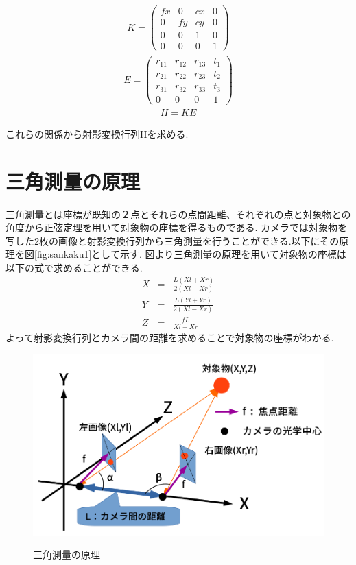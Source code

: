 \documentclass[12pt,oneside]{sotsuken_paper}
\begin{document}
\begin{eqnarray}
  K = \left(
    \begin{array}{cccc}
      fx & 0 & cx & 0\\
      0 & fy & cy & 0\\
      0 & 0 & 1 & 0\\
      0 & 0 & 0 & 1
    \end{array}
  \right)
\end{eqnarray}
\begin{eqnarray}
  E = \left(
    \begin{array}{cccc}
      r_{11} & r_{12} & r_{13} & t_1\\
      r_{21} & r_{22} & r_{23} & t_2\\
      r_{31} & r_{32} & r_{33} & t_3\\
      0 & 0 & 0 & 1
    \end{array}
  \right)
\end{eqnarray}
\begin{eqnarray}
  H = KE
\end{eqnarray}

これらの関係から射影変換行列Hを求める.
\section{三角測量の原理}
三角測量とは座標が既知の２点とそれらの点間距離、それぞれの点と対象物との角度から正弦定理を用いて対象物の座標を得るものである.
カメラでは対象物を写した2枚の画像と射影変換行列から三角測量を行うことができる.以下にその原理を図\ref{fig:sankaku1}として示す.
図より三角測量の原理を用いて対象物の座標は以下の式で求めることができる.
\begin{eqnarray}
	X&=&\frac{L(Xl+Xr)}{2(Xl-Xr)}\\
	Y&=&\frac{L(Yl+Yr)}{2(Xl-Xr)}\\
	Z&=&\frac{fL}{Xl-Xr}
\end{eqnarray}
よって射影変換行列とカメラ間の距離を求めることで対象物の座標がわかる.

\begin{figure}[htp]
 \begin{center}
  \includegraphics[width=120mm]{img/soft/sankaku1.png}
 　\caption{三角測量の原理}
  \label{fig:sankaku１}%
 \end{center}
\end{figure}
\end{document}
